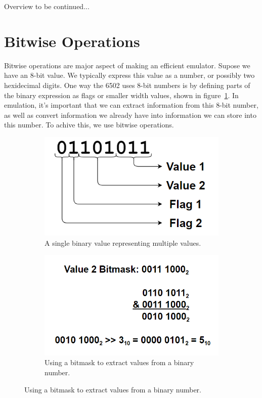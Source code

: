 \documentclass[12pt]{article}
\begin{document}
Overview to be continued...

\section{Bitwise Operations}
\label{sec:bitwise}

Bitwise operations are major aspect of making an efficient emulator. Supose we have an 8-bit value.
We typically express this value as a number, or possibly two hexidecimal digits. One way the 6502 uses
8-bit numbers is by defining parts of the binary expression as flags or smaller width values, shown in figure~\ref{fig:figure1}.
In emulation, it's important that we can extract information from this 8-bit number, as well as convert
information we already have into information we can store into this number. To achive this, we use
bitwise operations.

\begin{figure}[b!]
	\centering
	\begin{subfigure}[b]{0.5\linewidth}
		\includegraphics[width=\linewidth,bb=0 0 462 262]{figure1.PNG}
		\caption{A single binary value representing multiple values.}
		\label{fig:figure1}
	\end{subfigure}
	\begin{subfigure}[b]{0.5\linewidth}
		\includegraphics[width=\linewidth,bb=0 0 554 320]{figure2.PNG}
		\caption{Using a bitmask to extract values from a binary number.}
		\label{fig:figure2}
	\end{subfigure}
\end{figure}
\end{document}
